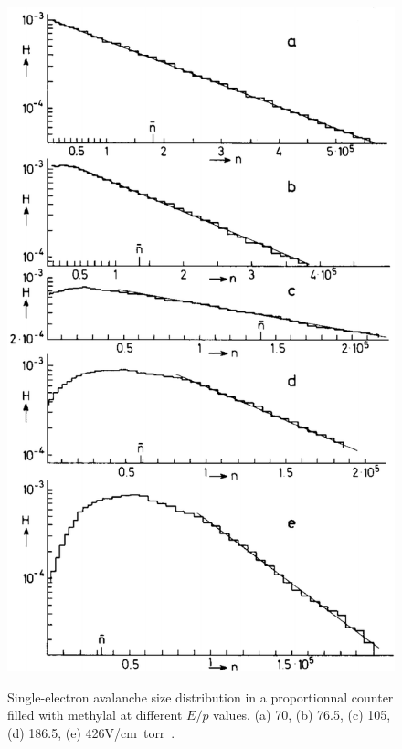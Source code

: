	\begin{figure}[H]
		\centering
		\includegraphics[width = 0.6\plotwidth]{fig/chapt4/Genz1973.png}\\
		\caption{\label{fig:genz} Single-electron avalanche size distribution in a proportionnal counter filled with methylal at different $E/p$ values. (a) 70, (b) 76.5, (c) 105, (d) 186.5, (e) 426\si{V/cm.torr}~\cite{GENZ1973}.}
	\end{figure}
	

